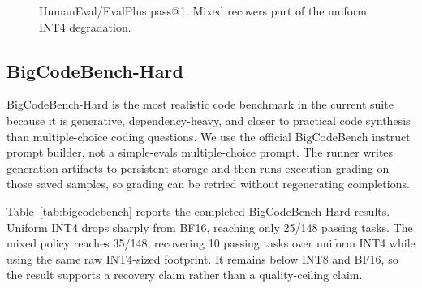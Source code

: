 \documentclass{article}
\begin{document}
\begin{figure}[t]
\centering
{}
\caption{HumanEval/EvalPlus pass@1. Mixed recovers part of the uniform INT4 degradation.}
\label{fig:evalplus}
\end{figure}

\subsection{BigCodeBench-Hard}

BigCodeBench-Hard is the most realistic code benchmark in the current suite because it is generative, dependency-heavy, and closer to practical code synthesis than multiple-choice coding questions. We use the official BigCodeBench instruct prompt builder, not a simple-evals multiple-choice prompt. The runner writes generation artifacts to persistent storage and then runs execution grading on those saved samples, so grading can be retried without regenerating completions.

Table~\ref{tab:bigcodebench} reports the completed BigCodeBench-Hard results. Uniform INT4 drops sharply from BF16, reaching only 25/148 passing tasks. The mixed policy reaches 35/148, recovering 10 passing tasks over uniform INT4 while using the same raw INT4-sized footprint. It remains below INT8 and BF16, so the result supports a recovery claim rather than a quality-ceiling claim.
\end{document}
